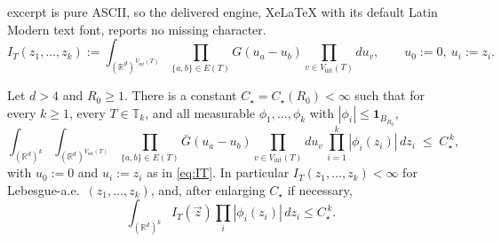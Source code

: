 \documentclass[10pt,a4paper]{amsart}
\newcommand{\R}{\mathbb{R}}
\newcommand{\T}{\mathbb{T}}                    %
\begin{document}
excerpt is pure ASCII, so the delivered engine, XeLaTeX with its default Latin Modern text font, reports no missing character.
\begin{equation}\label{eq:IT}
I_T(z_1,\dots,z_k)
:=\int_{(\R^d)^{V_{\mathrm{int}}(T)}}
\prod_{\{a,b\}\in E(T)}G(u_a-u_b)
\prod_{v\in V_{\mathrm{int}}(T)} du_v,
\qquad u_0:=0,\ u_i:=z_i .
\end{equation}

\begin{lemma}\label{lem:envelope}
Let $d>4$ and $R_0\ge1$. There is a constant $C_\star=C_\star(R_0)$$<\infty$
such that for
every $k\ge1$, every $T\in\T_k$, and all measurable
$\phi_1,\dots,\phi_k$ with $|\phi_i|\le\mathbf 1_{\overline B_{R_0}}$,
\begin{equation}\label{eq:envelope}
\int_{(\R^d)^{k}}\int_{(\R^d)^{V_{\mathrm{int}}(T)}}
\prod_{\{a,b\}\in E(T)}\bar G(u_a-u_b)
\prod_{v\in V_{\mathrm{int}}(T)}du_v\,
\prod_{i=1}^k|\phi_i(z_i)|\,dz_i
\;\le\;C_\star^{\,k},
\end{equation}
with $u_0:=0$ and $u_i:=z_i$ as in \eqref{eq:IT}. In particular
$I_T(z_1,\dots,z_k)<\infty$ for Lebesgue-a.e.\ $(z_1,\dots,z_k)$, and, after
enlarging $C_\star$ if necessary,
\[
\int_{(\R^d)^k}I_T(\vec z)\prod_i|\phi_i(z_i)|\,dz_i\le
C_\star^{\,k}.
\]

\end{lemma}
\end{document}
